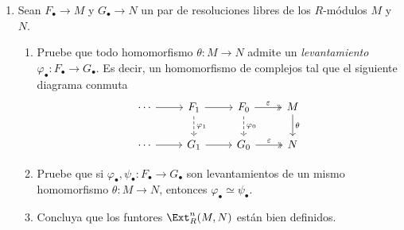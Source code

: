 \documentclass[11pt, reqno]{amsart}
\begin{document}
\begin{enumerate}
	\item Sean $F_\bullet \to M$ y $G_\bullet \to N$ un par de resoluciones libres de los $R$-módulos $M$ y $N$.
		\begin{enumerate}
			\item Pruebe que todo homomorfismo $\theta \colon M \to N$ admite un \emph{levantamiento} $\varphi_\bullet \colon F_\bullet \to G_\bullet$.
				Es decir, un homomorfismo de complejos tal que el siguiente diagrama conmuta
				\[\begin{tikzcd}
					\cdots & {F_1} & {F_0} & M \\
					\cdots & {G_1} & {G_0} & N
					\arrow[from=1-1, to=1-2]
					\arrow[from=1-2, to=1-3]
					\arrow["{\varphi_1}", dashed, from=1-2, to=2-2]
					\arrow["\varepsilon", two heads, from=1-3, to=1-4]
					\arrow["{\varphi_0}", dashed, from=1-3, to=2-3]
					\arrow["\theta", from=1-4, to=2-4]
					\arrow[from=2-1, to=2-2]
					\arrow[from=2-2, to=2-3]
					\arrow["\varepsilon", two heads, from=2-3, to=2-4]
				\end{tikzcd}\]

			\item\lookst Pruebe que si $\varphi_\bullet, \psi_\bullet \colon F_\bullet \to G_\bullet$ son levantamientos de un mismo homomorfismo $\theta \colon M \to N$,
				entonces $\varphi_\bullet \simeq \psi_\bullet$.

			\item Concluya que los funtores $\Ext_R^n(M, N)$ están bien definidos.
		\end{enumerate}
\end{enumerate}

\printbibliography
\end{document}
